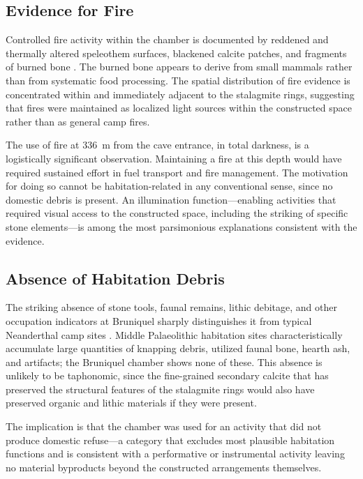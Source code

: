 \documentclass[12pt]{article}
\begin{document}
\subsection{Evidence for Fire}

Controlled fire activity within the chamber is documented by reddened and thermally altered speleothem surfaces, blackened calcite patches, and fragments of burned bone \citep{Jaubert2016}. The burned bone appears to derive from small mammals rather than from systematic food processing. The spatial distribution of fire evidence is concentrated within and immediately adjacent to the stalagmite rings, suggesting that fires were maintained as localized light sources within the constructed space rather than as general camp fires.

The use of fire at 336~m from the cave entrance, in total darkness, is a logistically significant observation. Maintaining a fire at this depth would have required sustained effort in fuel transport and fire management. The motivation for doing so cannot be habitation-related in any conventional sense, since no domestic debris is present. An illumination function—enabling activities that required visual access to the constructed space, including the striking of specific stone elements—is among the most parsimonious explanations consistent with the evidence.

\subsection{Absence of Habitation Debris}

The striking absence of stone tools, faunal remains, lithic debitage, and other occupation indicators at Bruniquel sharply distinguishes it from typical Neanderthal camp sites \citep{Jaubert2016}. Middle Palaeolithic habitation sites characteristically accumulate large quantities of knapping debris, utilized faunal bone, hearth ash, and artifacts; the Bruniquel chamber shows none of these. This absence is unlikely to be taphonomic, since the fine-grained secondary calcite that has preserved the structural features of the stalagmite rings would also have preserved organic and lithic materials if they were present.

The implication is that the chamber was used for an activity that did not produce domestic refuse—a category that excludes most plausible habitation functions and is consistent with a performative or instrumental activity leaving no material byproducts beyond the constructed arrangements themselves.
\end{document}

